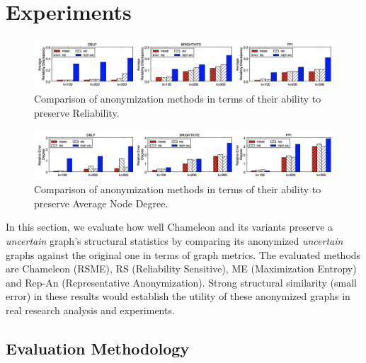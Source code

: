 \section{Experiments}
\label{sec:exp}
\begin{figure}[!htb]
    \centering
    \vspace{-5pt}
    \includegraphics[width=\linewidth]{exp/exp_rel.jpg}
    \caption{Comparison of anonymization methods in terms of their ability to preserve Reliability.}
    \label{fig:ex_rel}
    \vspace{-5pt}
\end{figure}
\begin{figure}[!htb]
    \vspace{-5pt}
    \centering
    \includegraphics[width=\linewidth]{exp/exp_degree.jpg}
    \caption{Comparison of anonymization methods in terms of their ability to preserve Average Node Degree.}
    \label{fig:ex_degree}
    \vspace{-5pt}
\end{figure}

In this section, we evaluate how well Chameleon and its variants preserve a \emph{uncertain} graph's structural statistics by comparing its anonymized \emph{uncertain} graphs against the original one in terms of graph metrics. The evaluated methods are Chameleon (RSME), RS (Reliability Sensitive), ME (Maximization Entropy) and Rep-An (Representative Anonymization).
Strong structural similarity (small error) in these results would establish the utility of these anonymized graphs in real research analysis and experiments. 

\subsection{Evaluation Methodology}

